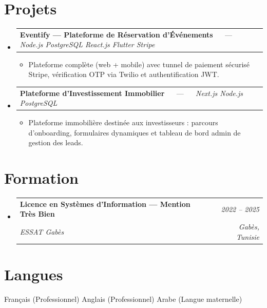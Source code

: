 \documentclass[letterpaper,9pt]{article}
\makeatletter
\newcommand{\resumeItem}[1]{\item\small{#1}}
\newcommand{\resumeSubheading}[4]{
  \vspace{-1pt}\item
  \begin{tabular*}{0.97\textwidth}[t]{l@{\extracolsep{\fill}}r}
    \textbf{#1} & \textit{\color{greytext}#2} \\
    \textit{\small\color{greytext} #3} & \textit{\small\color{greytext} #4}
  \end{tabular*}\vspace{-2pt}
}
\newcommand{\resumeProjectHeading}[2]{
  \item
  \begin{tabular*}{0.97\textwidth}{l@{\extracolsep{\fill}}r}
    \small #1 & #2
  \end{tabular*}\vspace{-1pt}
}
\newcommand{\resumeSubHeadingListStart}{\begin{itemize}[leftmargin=0.18in, label={}, itemsep=1.2pt, topsep=2.5pt, parsep=0pt]}
\newcommand{\resumeSubHeadingListEnd}{\end{itemize}\vspace{-2pt}}
\newcommand{\resumeProjectListStart}{\begin{itemize}[leftmargin=0.24in, label={}, itemsep=0.9pt, topsep=1.2pt, parsep=0pt]}
\newcommand{\resumeProjectListEnd}{\end{itemize}\vspace{-2pt}}
\makeatother
\begin{document}
\section{Projets}
\resumeSubHeadingListStart

  \resumeProjectHeading{\textbf{Eventify --- Plateforme de Réservation d'Événements} $\quad$ --- $\quad$ \emph{\color{greytext}Node.js \textperiodcentered{} PostgreSQL \textperiodcentered{} React.js \textperiodcentered{} Flutter \textperiodcentered{} Stripe}}{}
    \resumeProjectListStart
      \resumeItem{Plateforme complète (web + mobile) avec tunnel de paiement sécurisé Stripe, vérification OTP via Twilio et authentification JWT.}
    \resumeProjectListEnd

  \resumeProjectHeading{\textbf{Plateforme d'Investissement Immobilier} $\quad$ --- $\quad$ \emph{\color{greytext}Next.js \textperiodcentered{} Node.js \textperiodcentered{} PostgreSQL}}{}
    \resumeProjectListStart
      \resumeItem{Plateforme immobilière destinée aux investisseurs : parcours d'onboarding, formulaires dynamiques et tableau de bord admin de gestion des leads.}
    \resumeProjectListEnd

\resumeSubHeadingListEnd\vspace{-3pt}

\section{Formation}
\resumeSubHeadingListStart
  \resumeSubheading{Licence en Systèmes d'Information --- Mention Très Bien}{2022 -- 2025}{ESSAT Gabès}{Gabès, Tunisie}
\resumeSubHeadingListEnd\vspace{-1pt}

\section{Langues}
\begin{itemize}[leftmargin=0.18in, label={}, topsep=2pt, itemsep=1pt, parsep=0pt]
\footnotesize{
  \item Français (Professionnel) \textperiodcentered{} Anglais (Professionnel) \textperiodcentered{} Arabe (Langue maternelle)
}
\end{itemize}
\end{document}
